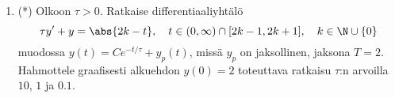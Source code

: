 \begin{enumerate}
\item (*)
Olkoon $\tau>0$. Ratkaise differentiaaliyhtälö
\[
\tau y'+y=\abs{2k-t}, \quad t\in(0,\infty)\cap[2k-1,2k+1], \quad k\in\N\cup\{0\} 
\]
muodossa $y(t)=Ce^{-t/\tau}+y_p(t)$, missä $y_p$ on jaksollinen, jaksona $T=2$. Hahmottele
graafisesti alkuehdon $y(0)=2$ toteuttava ratkaisu $\tau$:n arvoilla $10$, $1$ ja $0.1$.

\end{enumerate}